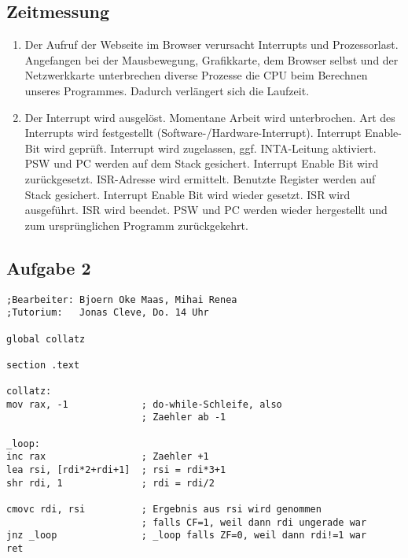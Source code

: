 \documentclass[paper=a4, english, ngerman]{scrartcl}
\begin{document}
	\subsection*{Zeitmessung}
	\begin{enumerate}
	\item Der Aufruf der Webseite im Browser verursacht Interrupts und Prozessorlast. Angefangen bei der Mausbewegung, Grafikkarte, dem Browser selbst und der Netzwerkkarte unterbrechen diverse Prozesse die CPU beim Berechnen unseres Programmes. Dadurch verlängert sich die Laufzeit.
	
	\item Der Interrupt wird ausgelöst. Momentane Arbeit wird unterbrochen. Art des Interrupts wird festgestellt (Software-/Hardware-Interrupt). Interrupt Enable-Bit wird geprüft. Interrupt wird zugelassen, ggf. INTA-Leitung aktiviert. PSW und PC werden auf dem Stack gesichert. Interrupt Enable Bit wird zurückgesetzt. ISR-Adresse wird ermittelt. Benutzte Register werden auf Stack gesichert. Interrupt Enable Bit wird wieder gesetzt. ISR wird ausgeführt. ISR wird beendet. PSW und PC werden wieder hergestellt und zum ursprünglichen Programm zurückgekehrt.
	\end{enumerate}

\pagebreak

	\subsection*{Aufgabe 2}
\begin{lstlisting}
;Bearbeiter: Bjoern Oke Maas, Mihai Renea
;Tutorium:   Jonas Cleve, Do. 14 Uhr

global collatz

section .text

collatz:
mov rax, -1				; do-while-Schleife, also
						; Zaehler ab -1

_loop:
inc rax					; Zaehler +1
lea rsi, [rdi*2+rdi+1]	; rsi = rdi*3+1
shr rdi, 1				; rdi = rdi/2

cmovc rdi, rsi			; Ergebnis aus rsi wird genommen
						; falls CF=1, weil dann rdi ungerade war
jnz _loop				; _loop falls ZF=0, weil dann rdi!=1 war
ret




\end{lstlisting}
\end{document}
